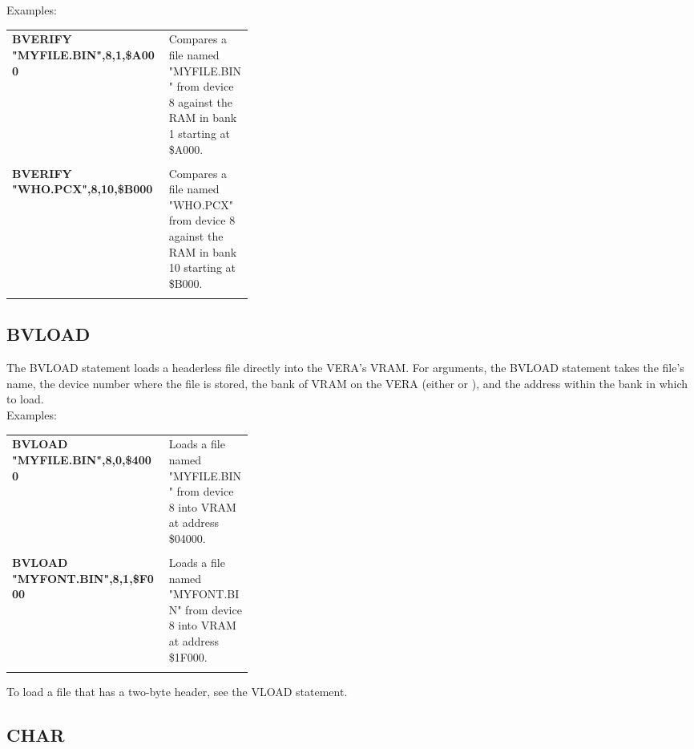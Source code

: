 Examples:\\

\begin{tabular}{l p{0.35\linewidth}}

	{\ttfamily\bfseries BVERIFY "MYFILE.BIN",8,1,\$A000}&Compares a file named
	"MYFILE.BIN" from device 8 against the RAM in bank 1 starting at
	\$A000.\\\\

	{\ttfamily\bfseries BVERIFY "WHO.PCX",8,10,\$B000}&Compares a file named
	"WHO.PCX" from device 8 against the RAM in bank 10 starting at \$B000.\\\\

\end{tabular}

\subsection{BVLOAD}

The {\ttfamily BVLOAD} statement loads a headerless file directly into the
VERA's VRAM.  For arguments, the {\ttfamily BVLOAD} statement takes the file's
name, the device number where the file is stored, the bank of VRAM on the VERA
(either {} or {}), and the address within the bank in
which to load.\\

Examples:\\

\begin{tabular}{l p{0.35\linewidth}}

	{\ttfamily\bfseries BVLOAD "MYFILE.BIN",8,0,\$4000}&Loads a file named
	"MYFILE.BIN" from device 8 into VRAM at address \$04000.\\\\

	{\ttfamily\bfseries BVLOAD "MYFONT.BIN",8,1,\$F000}&Loads a file named
	"MYFONT.BIN" from device 8 into VRAM at address \$1F000.\\\\

\end{tabular}

To load a file that has a two-byte header, see the {\ttfamily VLOAD} statement.\\

\subsection{CHAR}

